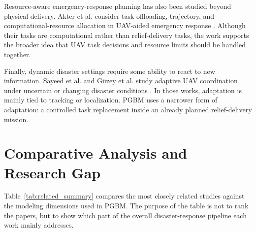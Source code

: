 Resource-aware emergency-response planning has also been studied beyond
physical delivery. Akter et al. consider task offloading, trajectory, and
computational-resource allocation in UAV-aided emergency response
\cite{akter2024satora,akter2025joint}. Although their tasks are computational
rather than relief-delivery tasks, the work supports the broader idea that UAV
task decisions and resource limits should be handled together.

Finally, dynamic disaster settings require some ability to react to new
information. Sayeed et al. and G\"uzey et al. study adaptive UAV coordination
under uncertain or changing disaster conditions
\cite{sayeed2026meanfield,guzey2026fedqmix}. In those works, adaptation is
mainly tied to tracking or localization. PGBM uses a narrower form of
adaptation: a controlled task replacement inside an already planned
relief-delivery mission.

\section{Comparative Analysis and Research Gap}
\label{sec_related_comparison}

Table~\ref{tab:related_summary} compares the most closely related studies
against the modeling dimensions used in PGBM. The purpose of the table is not
to rank the papers, but to show which part of the overall disaster-response
pipeline each work mainly addresses.

